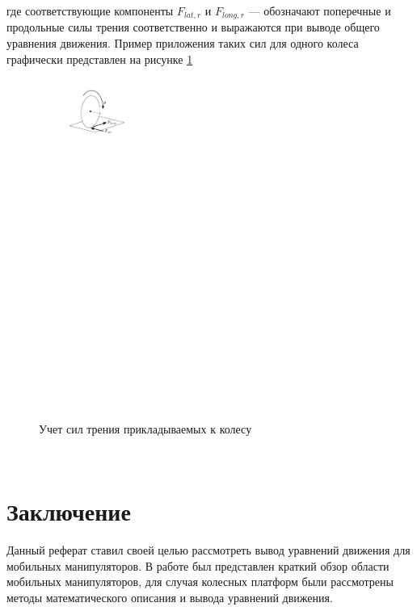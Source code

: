 \documentclass[14pt, a4paper]{extreport}
\begin{document}
\noindent
где соответствующие компоненты $F_{lat,r}$ и $F_{long,r}$ --- обозначают поперечные и продольные силы трения соответственно и выражаются при выводе общего уравнения движения. Пример приложения таких сил для одного колеса графически представлен на рисунке \ref{pic:8}

\begin{figure}[!h]
\centering
\captionsetup{justification=centering}
\renewcommand{\figurename}{Рисунок}
\includegraphics[width=0.7\textwidth]{wheelF.pdf}	%
\caption{Учет сил трения прикладываемых к колесу}
\label{pic:8}
\end{figure}



 


\newpage
\ \\

\section*{Заключение}

Данный реферат ставил своей целью рассмотреть вывод уравнений движения для мобильных манипуляторов. В работе был представлен краткий обзор области мобильных манипуляторов, для случая колесных платформ были рассмотрены методы математического описания и вывода уравнений движения. 
\end{document}
